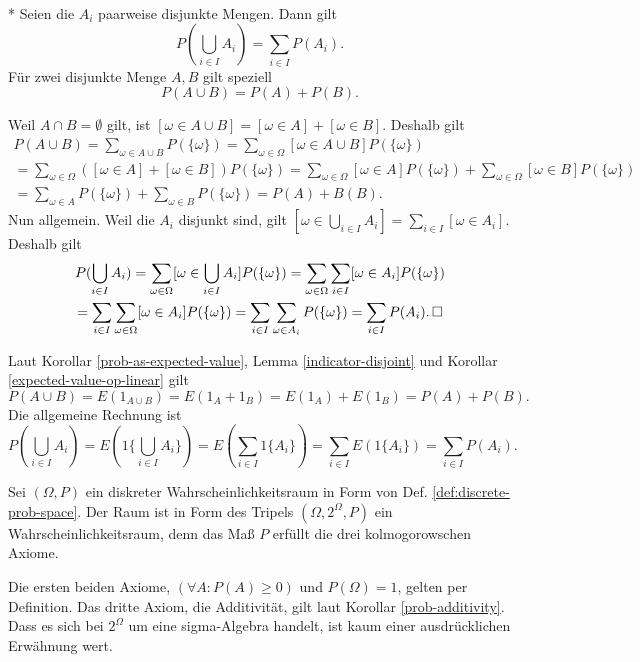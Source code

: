 \newpage
\begin{Korollar}%
\label{prob-additivity}\mbox{}\\*
Seien die $A_i$ paarweise disjunkte Mengen. Dann gilt
\[P(\bigcup_{i\in I} A_i) = \sum_{i\in I} P(A_i).\]
Für zwei disjunkte Menge $A,B$ gilt speziell
\[P(A\cup B) = P(A) + P(B).\]
\end{Korollar}

\begin{Beweis}[Beweis 1]
Weil $A\cap B=\emptyset$ gilt, ist $[\omega\in A\cup B]
= [\omega\in A]+[\omega\in B]$. Deshalb gilt
\begin{gather*}
P(A\cup B) = \sum_{\omega\in A\cup B} P(\{\omega\})
= \sum_{\omega\in\Omega} [\omega\in A\cup B] P(\{\omega\})\\
= \sum_{\omega\in\Omega} ([\omega\in A]+[\omega\in B]) P(\{\omega\})
= \sum_{\omega\in\Omega} [\omega\in A]P(\{\omega\})
+ \sum_{\omega\in\Omega} [\omega\in B]P(\{\omega\})\\
= \sum_{\omega\in A} P(\{\omega\}) + \sum_{\omega\in B} P(\{\omega\})
= P(A)+B(B).
\end{gather*}
Nun allgemein. Weil die $A_i$ disjunkt sind, gilt
$[\omega\in\bigcup_{i\in I} A_i] = \sum_{i\in I} [\omega\in A_i]$. Deshalb gilt
\begin{gather*}
P(\bigcup_{i\in I} A_i)
= \sum_{\omega\in\Omega}[\omega\in\bigcup_{i\in I} A_i]P(\{\omega\})
= \sum_{\omega\in\Omega}\sum_{i\in I}[\omega\in A_i]P(\{\omega\})\\
= \sum_{i\in I}\sum_{\omega\in\Omega}[\omega\in A_i]P(\{\omega\})
= \sum_{i\in I}\sum_{\omega\in A_i}P(\{\omega\})
= \sum_{i\in I}P(A_i).\,\square
\end{gather*}
\end{Beweis}
\begin{Beweis}[Beweis 2]
Laut Korollar \ref{prob-as-expected-value},
Lemma \ref{indicator-disjoint}
und Korollar \ref{expected-value-op-linear} gilt
\[P(A\cup B) = E(1_{A\cup B}) = E(1_A+1_B) = E(1_A) + E(1_B)
= P(A) + P(B).\]
Die allgemeine Rechnung ist
\[P(\bigcup_{i\in I} A_i) = E(1\{\bigcup_{i\in I} A_i\})
= E(\sum_{i\in I} 1\{A_i\})
= \sum_{i\in I} E(1\{A_i\}) = \sum_{i\in I} P(A_i).\]
\end{Beweis}

\begin{Korollar}
Sei $(\Omega,P)$ ein diskreter Wahrscheinlichkeitsraum in Form von Def.
\ref{def:discrete-prob-space}. Der Raum ist in Form des Tripels
$(\Omega,2^\Omega,P)$ ein Wahrscheinlichkeitsraum, denn das Maß
$P$ erfüllt die drei kolmogorowschen Axiome.
\end{Korollar}
\begin{Beweis}
Die ersten beiden Axiome, $(\forall A\colon P(A)\ge 0)$ und
$P(\Omega)=1$, gelten per Definition. Das dritte Axiom, die Additivität,
gilt laut Korollar \ref{prob-additivity}. Dass es sich bei $2^\Omega$
um eine sigma-Algebra handelt, ist kaum einer ausdrücklichen
Erwähnung wert.\,\qedsymbol
\end{Beweis}

